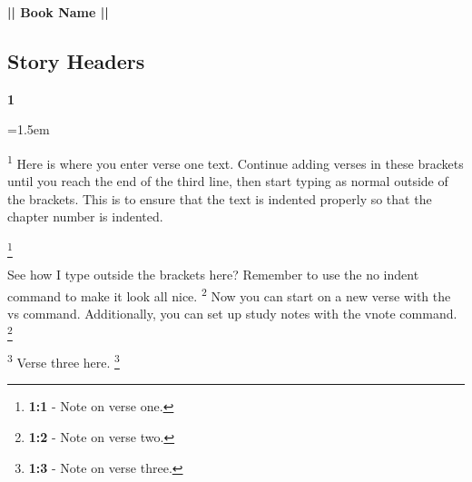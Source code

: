 \documentclass[12pt,twoside]{article}
\newcommand{\vs}[1]{\textsuperscript{#1}}
\newcommand{\vnote}[2]{%
  \begingroup
  \renewcommand\thefootnote{}%
  \footnote{\textbf{}#2}%
  \addtocounter{footnote}{-1}%
  \endgroup
}
\newcommand{\chapterWithIndent}[2]{%
  \noindent
  \begin{minipage}[t]{1cm}
    \vspace{-0.4\baselineskip}
    {\fontsize{40pt}{48pt}\selectfont \textbf{#1}}
  \end{minipage}%
  \hspace{0.3cm}%
  \begin{minipage}[t]{\dimexpr\linewidth - 1.5cm - 0.3cm\relax}
    \hangindent=1.5em
    \hangafter=3
    #2
    \vspace{-0.67cm}
  \end{minipage}
}
\begin{document}
\begin{center}
{\fontsize{40pt}{48pt}\selectfont \textbf{|| Book Name ||}}\\
\vspace{0.5cm}
\end{center}
\thispagestyle{fancy}




\subsection*{\textbf{Story Headers}}

\chapterWithIndent{1}{
    \vs{1} Here is where you enter verse one text. Continue adding verses in these brackets until you reach the end of the third line, then start typing as normal outside of the brackets. This is to ensure that the text is indented properly so that the chapter number is indented.
} 

\vnote{1}{\textbf{1:1} - Note on verse one.}

\noindent See how I type outside the brackets here? Remember to use the no indent command to make it look all nice.
\vs{2} Now you can start on a new verse with the vs command. Additionally, you can set up study notes with the vnote command.\vnote{2}{\textbf{1:2} - Note on verse two.}
\vs{3} Verse three here.\vnote{3}{\textbf{1:3} - Note on verse three.}
\end{document}
